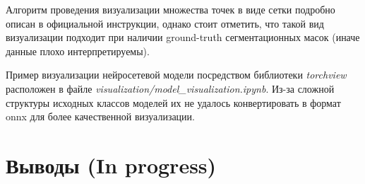 \documentclass[a4paper, 14pt]{extarticle}
\theoremstyle{definition}
\theoremstyle{plain}
\theoremstyle{remark}
\begin{document}
Алгоритм проведения визуализации множества точек в виде сетки подробно описан в официальной инструкции, однако стоит отметить, что такой вид визуализации подходит при наличии ground-truth сегментационных масок (иначе данные плохо интерпретируемы).

Пример визуализации нейросетевой модели посредством библиотеки \textit{torchview} расположен в файле \textit{visualization/model\_visualization.ipynb}. Из-за сложной структуры исходных классов моделей их не удалось конвертировать в формат onnx для более качественной визуализации.

\newpage


\section{Выводы (In progress)}
\newpage
\end{document}

